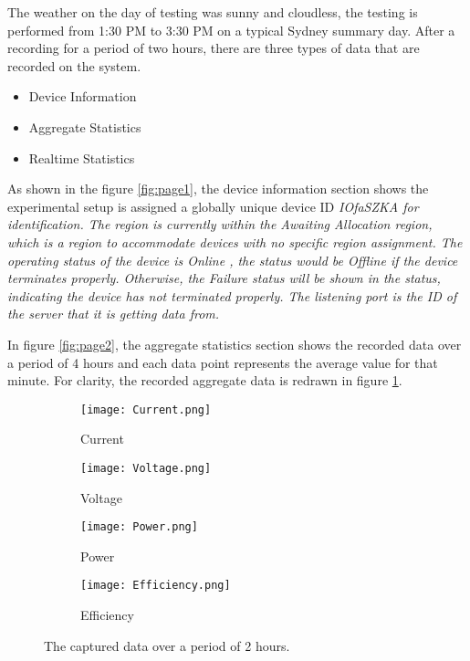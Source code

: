 \documentclass[../thesis.tex]{subfiles}
\begin{document}
The weather on the day of testing was sunny and cloudless, the testing is performed from 1:30 PM to 3:30 PM on a typical Sydney summary day. After a recording for a period of two hours, there are three types of data that are recorded on the system.

\begin{itemize}
\item Device Information
\item Aggregate Statistics
\item Realtime Statistics
\end{itemize}

As shown in the figure \ref{fig:page1}, the device information section shows the experimental setup is assigned a globally unique device ID \em IOfaSZKA \em for identification. The region is currently within the \em Awaiting Allocation \em region, which is a region to accommodate devices with no specific region assignment. The operating status of the device is \em Online \em, the status would be \em Offline \em if the device terminates properly. Otherwise, the \em Failure \em status will be shown in the status, indicating the device has not terminated properly. The listening port is the ID of the server that it is getting data from.

In figure \ref{fig:page2}, the aggregate statistics section shows the recorded data over a period of 4 hours and each data point represents the average value for that minute. For clarity, the recorded aggregate data is redrawn in figure \ref{fig:captured}.

\begin{figure}[!ht]
\centering
\begin{subfigure}[b]{0.49\linewidth}
\texttt{[image: Current.png]}
\caption{Current}
\end{subfigure}
\begin{subfigure}[b]{0.49\linewidth}
\texttt{[image: Voltage.png]}
\caption{Voltage}
\end{subfigure}
\begin{subfigure}[b]{0.49\linewidth}
\texttt{[image: Power.png]}
\caption{Power}
\end{subfigure}
\begin{subfigure}[b]{0.49\linewidth}
\texttt{[image: Efficiency.png]}
\caption{Efficiency}
\end{subfigure}
\caption{The captured data over a period of 2 hours.}
\label{fig:captured}
\end{figure}
\end{document}
